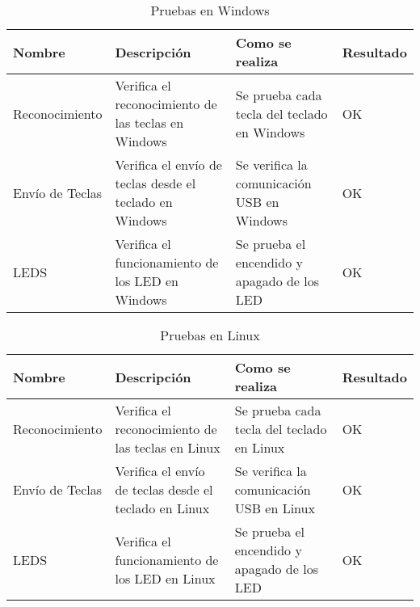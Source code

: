 \begin{table}[!htb]
\small
\begin{tabular}{|l|p{3cm}|p{3.5cm}|l|}
\hline
Nombre           & Descripción                                               & Como se realiza                                    & Resultado \\ \hline
Reconocimiento   & Verifica el reconocimiento de las teclas en \gls{Windows}        & Se prueba cada tecla del teclado en \gls{Windows}        & OK         \\ \hline
Envío de Teclas  & Verifica el envío de teclas desde el teclado en \gls{Windows}    & Se verifica la comunicación \gls{USB} en \gls{Windows}         & OK         \\ \hline
\gls{LED}S             & Verifica el funcionamiento de los \gls{LED} en \gls{Windows}           & Se prueba el encendido y apagado de los \gls{LED}        & OK         \\ \hline
\end{tabular}
\caption{Pruebas en \gls{Windows}}
\label{Table:PruebaSistemaWindows}
\end{table}

\phantom{Espacio}
\begin{table}[!htb]
\small
\begin{tabular}{|l|p{3cm}|p{3.5cm}|l|}
\hline
Nombre           & Descripción                                               & Como se realiza                                    & Resultado \\ \hline
Reconocimiento   & Verifica el reconocimiento de las teclas en \gls{Linux}        & Se prueba cada tecla del teclado en \gls{Linux}        & OK         \\ \hline
Envío de Teclas  & Verifica el envío de teclas desde el teclado en \gls{Linux}    & Se verifica la comunicación \gls{USB} en \gls{Linux}         & OK         \\ \hline
\gls{LED}S             & Verifica el funcionamiento de los \gls{LED} en \gls{Linux}           & Se prueba el encendido y apagado de los \gls{LED}        & OK         \\ \hline
\end{tabular}
\caption{Pruebas en \gls{Linux}}
\label{Table:PruebaSistemaLinux}
\end{table}
    